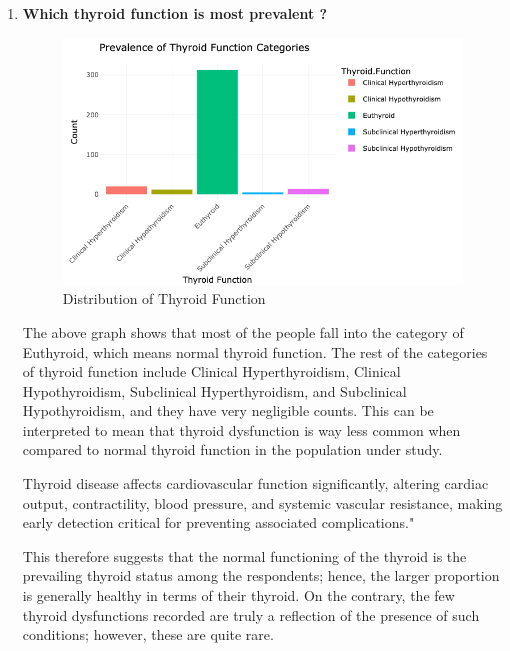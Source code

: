 \documentclass[12pt]{article}
\begin{document}
\begin{enumerate}
    \item \textbf{Which thyroid function is most prevalent ?}

 \begin{figure}[h]
        \vspace{5pt}
        \centering
        \includegraphics[width=1.15\textwidth]{prevelence vs function.png}  
        \caption{Distribution of Thyroid Function}
            \label{fig:example}
       \vspace{0.5cm}
    \end{figure}

The above graph shows that most of the people fall into the category of Euthyroid, which means normal thyroid function. The rest of the categories of thyroid function include Clinical Hyperthyroidism, Clinical Hypothyroidism, Subclinical Hyperthyroidism, and Subclinical Hypothyroidism, and they have very negligible counts. This can be interpreted to mean that thyroid dysfunction is way less common when compared to normal thyroid function in the population under study.

Thyroid disease affects cardiovascular function significantly, altering cardiac output, contractility, blood pressure, and systemic vascular resistance, making early detection critical for preventing associated complications."

\hspace{9pt} This therefore suggests that the normal functioning of the thyroid is the prevailing thyroid status among the respondents; hence, the larger proportion is generally healthy in terms of their thyroid. On the contrary, the few thyroid dysfunctions recorded are truly a reflection of the presence of such conditions; however, these are quite rare.


\end{enumerate}
\end{document}
